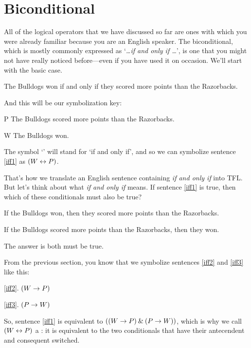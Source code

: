 \section{Biconditional}\label{s:biconditional-1}

All of the logical operators that we have discussed so far are ones with which you were already familiar because you are an English speaker. The biconditional, which is mostly commonly expressed as `\textit{\ldots if and only if \ldots}', is one that you might not have really noticed before---even if you have used it on occasion. We'll start with the basic case.
	\begin{earg}
		\item[\ex{iff1}] The Bulldogs won if and only if they scored more points than the Razorbacks.
	\end{earg}
And this will be our symbolization key:
	\begin{ekey}
		\item[P] The Bulldogs scored more points than the Razorbacks.
		\item[W] The Bulldogs won.
	\end{ekey}
The symbol `\eiff' will stand for `if and only if', and so we can symbolize sentence \ref{iff1} as $(W \leftrightarrow P)$.

That's how we translate an English sentence containing \textit{if and only if} into TFL. But let's think about what \textit{if and only if} means. If sentence \ref{iff1} is true, then which of these conditionals must also be true?
	\begin{earg}
		\item[\ex{iff2}] If the Bulldogs won, then they scored more points than the Razorbacks.
		\item[\ex{iff3}] If the Bulldogs scored more points than the Razorbacks, then they won.
	\end{earg}
The answer is both must be true.
	
From the previous section, you know that we symbolize sentences \ref{iff2} and \ref{iff3} like this:
	\begin{earg}
		\item[\ref{iff2}.] $(W \rightarrow P)$
		\item[\ref{iff3}.] $(P \rightarrow W)$ 
	\end{earg}
So, sentence \ref{iff1} is equivalent to $((W \rightarrow P) \mathbin{\&} (P \rightarrow W))$, which is why we call $(W \leftrightarrow P)$ a : it is equivalent to the two conditionals that have their antecendent and consequent switched.

